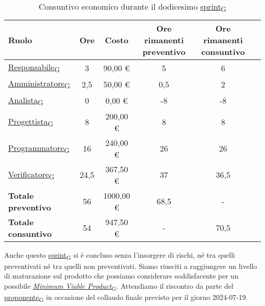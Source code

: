 \newpage
{}
\begin{table}[!h]
    \centering
    \begin{tabular}{ | l | c | c | c | c | c | }
        \hline
        \textbf{Ruolo} & \textbf{Ore} & \textbf{Costo} & \textbf{Ore rimanenti preventivo} & \textbf{Ore rimanenti consuntivo} \\
        \hline
        \href{https://7last.github.io/docs/pb/documentazione-interna/glossario\#responsabile}{Responsabile\textsubscript{G}}     &  3   &   90,00 € &   5   &   6   \\
        \href{https://7last.github.io/docs/pb/documentazione-interna/glossario\#amministratore}{Amministratore\textsubscript{G}} &  2,5 &   50,00 € &   0,5 &   2   \\
        \href{https://7last.github.io/docs/pb/documentazione-interna/glossario\#analista}{Analista\textsubscript{G}}             &  0   &    0,00 € &  -8   &  -8   \\
        \href{https://7last.github.io/docs/pb/documentazione-interna/glossario\#progettista}{Progettista\textsubscript{G}}       &  8   &  200,00 € &   8   &   8   \\
        \href{https://7last.github.io/docs/pb/documentazione-interna/glossario\#programmatore}{Programmatore\textsubscript{G}}   & 16   &  240,00 € &  26   &  26   \\
        \href{https://7last.github.io/docs/pb/documentazione-interna/glossario\#verificatore}{Verificatore\textsubscript{G}}     & 24,5 &  367,50 € &  37   &  36,5 \\
        \hline
        \textbf{Totale preventivo} & 56   & 1000,00 € &  68,5 &   -   \\
        \hline
        \textbf{Totale consuntivo} & 54   &  947,50 € &   -   &  70,5 \\
        \hline
    \end{tabular}
    \caption{Consuntivo economico durante il dodicesimo \href{https://7last.github.io/docs/pb/documentazione-interna/glossario\#sprint}{sprint\textsubscript{G}}}
\end{table}

Anche questo \href{https://7last.github.io/docs/pb/documentazione-interna/glossario\#sprint}{sprint\textsubscript{G}} si è concluso senza l'insorgere di rischi, né tra quelli preventivati né tra quelli non preventivati. Siamo riusciti a raggiungere un livello di maturazione sul prodotto che possiamo considerare soddisfacente per un possibile \href{https://7last.github.io/docs/pb/documentazione-interna/glossario\#minimum-viable-product}{\textit{Minimum Viable Product}\textsubscript{G}}. Attendiamo il riscontro da parte del \href{https://7last.github.io/docs/pb/documentazione-interna/glossario\#proponente}{proponente\textsubscript{G}} in occasione del collaudo finale previsto per il giorno 2024-07-19.

